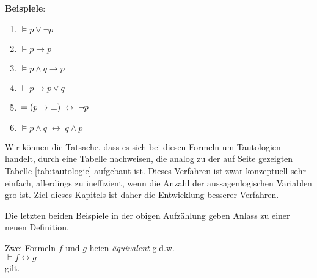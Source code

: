\noindent
\textbf{Beispiele}:
\begin{enumerate}
\item $\models p \vee \neg p$
\item $\models p \rightarrow p$
\item $\models p \wedge q \rightarrow p$
\item $\models p \rightarrow p \vee q$
\item $\models (p \rightarrow \bot) \;\leftrightarrow\; \neg p$
\item $\models p \wedge q \;\leftrightarrow\; q \wedge p$
\end{enumerate}
Wir k\"{o}nnen die Tatsache, dass es sich bei diesen Formeln um Tautologien handelt, durch
eine Tabelle nachweisen, die analog zu der auf Seite \pageref{tab:tautologie} gezeigten
Tabelle \ref{tab:tautologie} aufgebaut ist.  Dieses Verfahren ist zwar konzeptuell sehr
einfach, allerdings zu ineffizient, wenn die Anzahl der aussagenlogischen Variablen gro\3
ist.  Ziel dieses Kapitels ist daher die Entwicklung besserer Verfahren.

Die letzten beiden Beispiele in der obigen Aufz\"{a}hlung geben Anlass zu einer neuen Definition.
\begin{Definition}[Ãquivalent]
  Zwei Formeln $f$ und $g$ hei\3en \emph{\"{a}quivalent} g.d.w.  \\[0.2cm]
  \hspace*{1.3cm} $\models f \leftrightarrow g$ 
  \\[0.1cm]
  gilt.
  \eox
\end{Definition}


